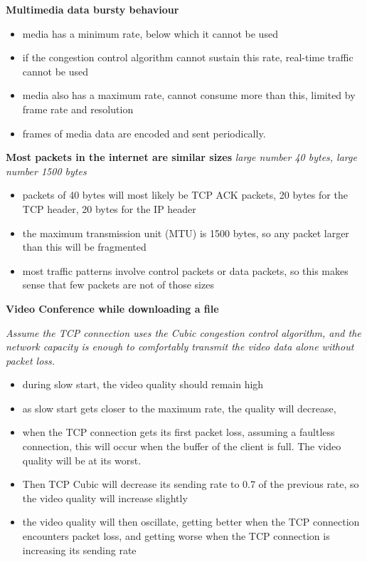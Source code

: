 \documentclass{article}
\begin{document}
\textbf{Multimedia data bursty behaviour}
\begin{itemize}
    \item media has a minimum rate, below which it cannot be used
    \item if the congestion control algorithm cannot sustain this rate, real-time traffic cannot be used
    \item media also has a maximum rate, cannot consume more than this, limited by frame rate and resolution
    \item frames of media data are encoded and sent periodically.
\end{itemize}

\textbf{Most packets in the internet are similar sizes}
\textit{large number 40 bytes, large number 1500 bytes}
\begin{itemize}
    \item packets of 40 bytes will most likely be TCP ACK packets, 20 bytes for the TCP header, 20 bytes for the IP header
    \item the maximum transmission unit (MTU) is 1500 bytes, so any packet larger than this will be fragmented
    \item most traffic patterns involve control packets or data packets, so this makes sense that few packets are not of those sizes
\end{itemize}


\textbf{Video Conference while downloading a file}

\textit{Assume the TCP connection uses the Cubic congestion control algorithm, and the network capacity is enough to comfortably transmit the video data alone without packet loss.}
\begin{itemize}
    \item during slow start, the video quality should remain high
    \item as slow start gets closer to the maximum rate, the quality will decrease,
    \item when the TCP connection gets its first packet loss, assuming a faultless connection, this will occur when the buffer of the client is full. The video quality will be at its worst.
    \item Then TCP Cubic will decrease its sending rate to 0.7 of the previous rate, so the video
    quality will increase slightly
    \item the video quality will then oscillate, getting better when the TCP connection encounters packet loss, and getting worse when the TCP connection is increasing its sending rate
\end{itemize}
\end{document}
